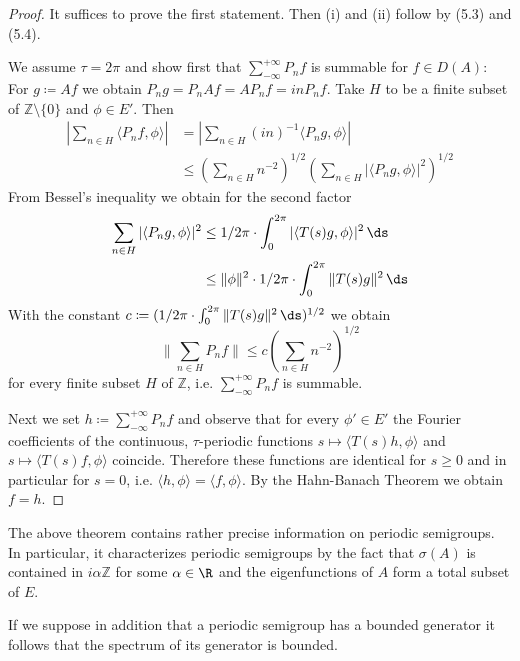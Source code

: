 \begin{proof}
It suffices to prove the first statement. Then (i) and (ii) follow by (5.3) and (5.4).

We assume $\tau = 2\pi$ and show first that $\sum_{-\infty}^{+\infty} P_{n}f$ is summable for $f \in D(A)$: For $g \coloneqq Af$ we obtain $P_{n}g = P_{n}Af = AP_{n}f = inP_{n}f$.
Take $H$ to be a finite subset of $\mathbb{Z} \setminus \{0\}$ and $\phi \in E'$. Then
\begin{align*}
\left|\sum_{n \in H} \langle P_{n}f,\phi \rangle\right|
&= \left|\sum_{n \in H} (in)^{-1} \langle P_{n}g,\phi \rangle\right| \\
&\leq (\sum_{n \in H} n^{-2})^{1/2}(\sum_{n \in H} |\langle P_{n}g,\phi \rangle|^{2})^{1/2}
\end{align*}
From Bessel's inequality we obtain for the second factor
\begin{align*}
\sum_{n \in H} |\langle P_{n}g,\phi \rangle|^{2} &\leq 1/2\pi \cdot \int_{0}^{2\pi} |\langle T(s)g,\phi \rangle|^{2} \, \ds \\
&\leq \|\phi\|^{2} \cdot 1/2\pi \cdot \int_{0}^{2\pi} \|T(s)g\|^{2} \, \ds
\end{align*}
With the constant $c \coloneqq (1/2\pi \cdot \int_{0}^{2\pi} \|T(s)g\|^{2} \, \ds)^{1/2}$ we obtain
\[
\|\sum_{n \in H} P_{n}f\| \leq c(\sum_{n \in H} n^{-2})^{1/2}
\]
for every finite subset $H$ of $\mathbb{Z}$, i.e. $\sum_{-\infty}^{+\infty} P_{n}f$ is summable.

Next we set $h \coloneqq \sum_{-\infty}^{+\infty} P_{n}f$ and observe that for every $\phi' \in E'$ the Fourier coefficients of the continuous, $\tau$-periodic functions
$s \mapsto \langle T(s)h,\phi \rangle$ and $s \mapsto \langle T(s)f,\phi \rangle$
coincide.
Therefore these functions are identical for $s \geq 0$ and in particular for $s = 0$, i.e. $\langle h,\phi \rangle = \langle f,\phi \rangle$.
By the Hahn-Banach Theorem we obtain $f = h$.
\end{proof}

The above theorem contains rather precise information on periodic semigroups.
In particular, it characterizes periodic semigroups by the fact that $\sigma(A)$ is contained in $i\alpha\mathbb{Z}$ for some $\alpha \in \R$ and the eigenfunctions of $A$ form a total subset of $E$.

If we suppose in addition that a periodic semigroup has a bounded generator it follows that the spectrum of its generator is bounded.



